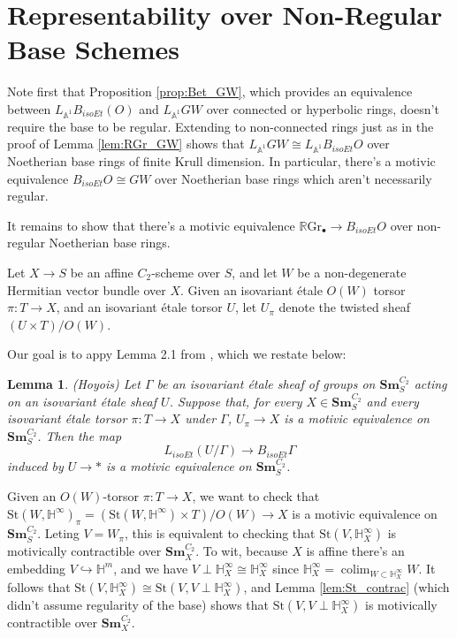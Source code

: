 \documentclass[edeposit,fullpage]{uiucthesis2009}
\newcommand{\mbb}{\mathbb}
\newcommand{\RGr}{\mathbb R\mathrm{Gr}}
\newcommand{\Sm}[1]{\mathbf{Sm}_{#1}}
\newcommand{\St}{\mathrm{St}}
\DeclareMathOperator*{\colim}{colim}
\theoremstyle{plain}
\newtheorem{lemma}{Lemma}
\numberwithin{lemma}{section}
\theoremstyle{definition}
\begin{document}
\section{Representability over Non-Regular Base Schemes}

Note first that Proposition \ref{prop:Bet_GW}, which provides an 
equivalence between $L_{\mbb A^1}B_{isoEt}(O)$ and $L_{\mbb A^1}GW$
over connected or hyperbolic rings, doesn't require the base
to be regular. Extending to non-connected rings just as in the proof
of Lemma \ref{lem:RGr_GW} shows that $L_{\mbb A^1}GW \cong
L_{\mbb A^1} B_{isoEt}O$ over Noetherian base rings of finite Krull dimension. In particular,
there's a motivic equivalence $B_{isoEt}O \cong GW$ over Noetherian
base rings which aren't necessarily regular.

It remains to show that there's a motivic equivalence $\RGr_\bullet
\rightarrow B_{isoEt}O$ over non-regular Noetherian base rings. 

Let  $X \rightarrow S$ be an affine
$C_2$-scheme over $S$, and let $W$ be a non-degenerate Hermitian
vector bundle over $X$. Given an isovariant \'etale $O(W)$
torsor $\pi : T \rightarrow X$, and an isovariant \'etale torsor $U$, let $U_\pi$ denote
the twisted sheaf $(U \times T)/O(W)$. 

Our goal is to appy Lemma 2.1 from \cite{cdhdesc}, which we restate below:

\begin{lemma}(Hoyois)
Let $\Gamma$ be an isovariant \'etale sheaf of groups on $\Sm{S}^{C_2}$
acting on an isovariant \'etale sheaf $U$. Suppose that, for every $X
\in \Sm{S}^{C_2}$ and every isovariant \'etale torsor $\pi: T
\rightarrow X$ under $\Gamma$, $U_\pi \rightarrow X$ is a motivic
equivalence on $\Sm{S}^{C_2}$. Then the map
\[
L_{isoEt}(U/\Gamma) \rightarrow B_{isoEt}\Gamma
\]
induced by $U \rightarrow \ast$ is a motivic equivalence on $\Sm{S}^{C_2}$.
\end{lemma}

Given an $O(W)$-torsor $\pi : T \rightarrow X$, we want to check that $\St(W,\mbb H^\infty)_\pi  =(\St(W,\mbb H^\infty) \times T)/O(W) \rightarrow
X$ is a motivic equivalence on $\Sm{S}^{C_2}$. Leting $V = W_\pi$,
this is equivalent to checking
that $\St(V,\mbb H^\infty_X)$ is motivically contractible
over $\Sm{X}^{C_2}$. To wit, because $X$ is affine there's an
embedding $V \hookrightarrow \mbb H^m$, and we have $V \perp \mbb
H^\infty_X \cong \mbb H^\infty_X$ since $\mbb H^\infty_X = \colim_{W
  \subset \mbb H^\infty_X} W$. It follows that $\St(V,\mbb H^\infty_X)
\cong \St(V,V \perp \mbb H^\infty_X)$, and Lemma
\ref{lem:St_contrac} (which didn't assume regularity of the base) shows
that $\St(V,V \perp \mbb H^\infty_X)$ is motivically contractible over
$\Sm{X}^{C_2}$. 
\end{document}
